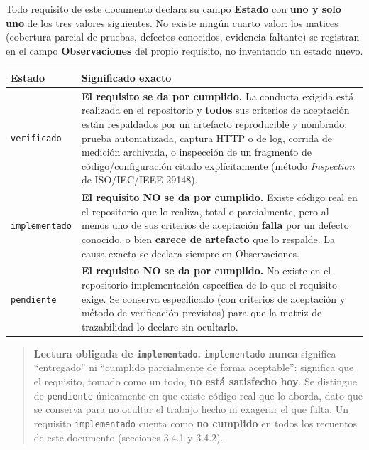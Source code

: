 \documentclass[
  spanish,
]{article}
\newcounter{none} %
\begin{document}
Todo requisito de este documento declara su campo \textbf{Estado} con
\textbf{uno y solo uno} de los tres valores siguientes. No existe ningún
cuarto valor: los matices (cobertura parcial de pruebas, defectos
conocidos, evidencia faltante) se registran en el campo
\textbf{Observaciones} del propio requisito, no inventando un estado
nuevo.

{\def\LTcaptype{none} %
\begin{longtable}[]{@{}
  >{\raggedright\arraybackslash}p{}
  >{\raggedright\arraybackslash}p{}@{}}
\toprule\noalign{}
\begin{minipage}[b]{\linewidth}\raggedright
Estado
\end{minipage} & \begin{minipage}[b]{\linewidth}\raggedright
Significado exacto
\end{minipage} \\
\midrule\noalign{}
\endhead
\bottomrule\noalign{}
\endlastfoot
\texttt{verificado} & \textbf{El requisito se da por cumplido.} La
conducta exigida está realizada en el repositorio y \textbf{todos} sus
criterios de aceptación están respaldados por un artefacto reproducible
y nombrado: prueba automatizada, captura HTTP o de log, corrida de
medición archivada, o inspección de un fragmento de código/configuración
citado explícitamente (método \emph{Inspection} de ISO/IEC/IEEE
29148). \\
\texttt{implementado} & \textbf{El requisito NO se da por cumplido.}
Existe código real en el repositorio que lo realiza, total o
parcialmente, pero al menos uno de sus criterios de aceptación
\textbf{falla} por un defecto conocido, o bien \textbf{carece de
artefacto} que lo respalde. La causa exacta se declara siempre en
Observaciones. \\
\texttt{pendiente} & \textbf{El requisito NO se da por cumplido.} No
existe en el repositorio implementación específica de lo que el
requisito exige. Se conserva especificado (con criterios de aceptación y
método de verificación previstos) para que la matriz de trazabilidad lo
declare sin ocultarlo. \\
\end{longtable}
}

\begin{quote}
\textbf{Lectura obligada de \texttt{implementado}.}
\texttt{implementado} \textbf{nunca} significa ``entregado'' ni
``cumplido parcialmente de forma aceptable'': significa que el
requisito, tomado como un todo, \textbf{no está satisfecho hoy}. Se
distingue de \texttt{pendiente} únicamente en que existe código real que
lo aborda, dato que se conserva para no ocultar el trabajo hecho ni
exagerar el que falta. Un requisito \texttt{implementado} cuenta como
\textbf{no cumplido} en todos los recuentos de este documento (secciones
3.4.1 y 3.4.2).
\end{quote}
\end{document}
